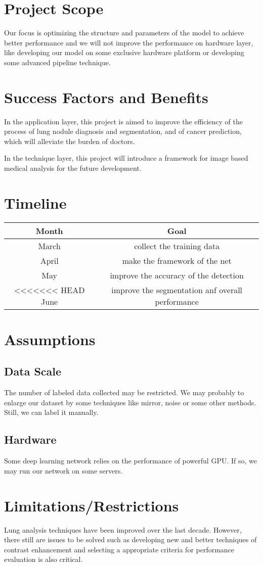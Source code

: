 \documentclass[hyperref]{article}
\theoremstyle{nonumberplain}
\begin{document}
\section{Project Scope}
Our focus is optimizing the structure and parameters of the model to achieve better performance and we will not improve the performance on hardware layer, like developing our model on some exclusive hardware platform or developing some advanced pipeline technique.

\section{Success Factors and Benefits}
In the application layer, this project is aimed to improve the efficiency of the process of lung nodule diagnosis and segmentation, and of cancer prediction, which will alleviate the burden of doctors. 

In the technique layer, this project will introduce a framework for image based medical analysis for the future development.

\section{Timeline}
\begin{center}
	\begin{tabular}{c|c}
		Month & Goal \\
		\hline
		March & collect the training data\\
		\hline
		April & make the framework of the net\\
		\hline
		May   & improve the accuracy of the detection\\
		\hline
		<<<<<<< HEAD
		June  & improve the segmentation anf overall performance\\
		\hline
	\end{tabular}
\end{center}

\section{Assumptions}
\subsection{Data Scale}
The number of labeled data collected may be restricted. We may probably to enlarge our dataset by some techniques like mirror, noise or some other methods. Still, we can label it manually.
\subsection{Hardware}
Some deep learning network relies on the performance of powerful GPU. If so, we may run our network on some servers.

\section{Limitations/Restrictions}
Lung analysis techniques have been improved over the last decade. However, there still are issues to be solved such as developing new and better techniques of contrast enhancement and selecting a appropriate criteria for performance evaluation is also critical. 
\end{document}
